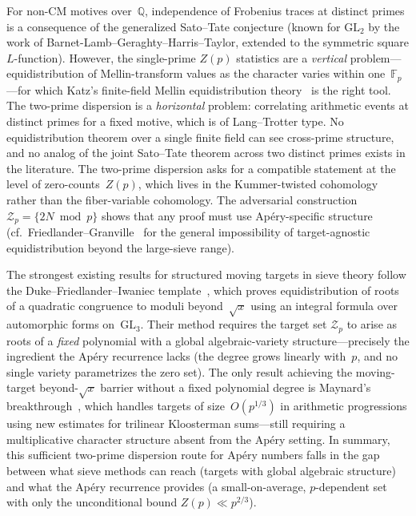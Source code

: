 \documentclass[11pt]{article}
\theoremstyle{definition}
\theoremstyle{remark}
\begin{document}
For non-CM motives over~$\mathbb{Q}$,
independence of Frobenius traces at
distinct primes is a consequence of
the generalized Sato--Tate conjecture
(known for $\mathrm{GL}_2$ by the
work of Barnet-Lamb--Geraghty--Harris--Taylor,
extended to the symmetric square
$L$-function).
However, the single-prime $Z(p)$
statistics are a \emph{vertical}
problem---equidistribution of
Mellin-transform values as the
character varies within one~$\mathbb{F}_p$---for
which Katz's finite-field Mellin
equidistribution theory~\cite{Katz2012}
is the right tool.
The two-prime dispersion is a
\emph{horizontal} problem:
correlating arithmetic events at
distinct primes for a fixed motive,
which is of Lang--Trotter type.
No equidistribution theorem over a
single finite field can see cross-prime
structure, and no analog of the joint
Sato--Tate theorem across two distinct
primes exists in the literature.
The two-prime dispersion asks for a
compatible statement at the level of
zero-counts~$Z(p)$, which lives in the
Kummer-twisted cohomology rather than
the fiber-variable cohomology.
The adversarial construction
$\mathcal{Z}_p = \{2N \bmod p\}$
shows that any proof must use
Ap\'ery-specific structure
(cf.~Friedlander--Granville~\cite{FG1989}
for the general impossibility of
target-agnostic equidistribution beyond
the large-sieve range).

The strongest existing results for
structured moving targets in sieve theory
follow the Duke--Friedlander--Iwaniec
template~\cite{DFI1995}, which proves
equidistribution of roots of a quadratic
congruence to moduli beyond~$\sqrt{x}$
using an integral formula over
automorphic forms on~$\mathrm{GL}_3$.
Their method requires the target set
$\mathcal{Z}_p$ to arise as roots of a
\emph{fixed} polynomial with a global
algebraic-variety structure---precisely
the ingredient the Ap\'ery recurrence
lacks (the degree grows linearly
with~$p$, and no single variety
parametrizes the zero set).
The only result achieving the moving-target
beyond-$\!\sqrt{x}$ barrier without a fixed
polynomial degree is Maynard's
breakthrough~\cite{Maynard2020},
which handles targets of size~$O(p^{1/3})$
in arithmetic progressions using new estimates
for trilinear Kloosterman sums---still
requiring a multiplicative character
structure absent from the Ap\'ery setting.
In summary, this sufficient two-prime dispersion route
for Ap\'ery numbers falls in the gap
between what sieve methods can reach
(targets with global algebraic structure)
and what the Ap\'ery recurrence provides
(a small-on-average, $p$-dependent set with only the
unconditional bound $Z(p)\ll p^{2/3}$).
\end{document}
